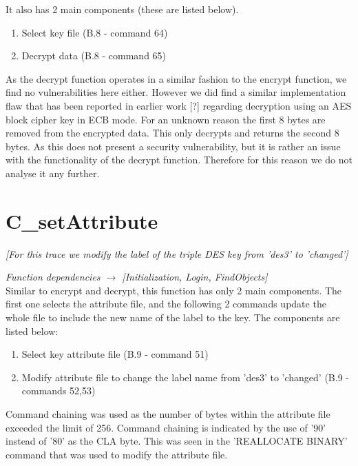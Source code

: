 \documentclass[bsc,frontabs,twoside,singlespacing,parskip,deptreport]{infthesis}     %
\begin{document}
It also has 2 main components (these are listed below).\\

\begin{enumerate}
\item Select key file (B.8 - command 64)
\item Decrypt data (B.8 - command 65)\\
\end{enumerate}

As the decrypt function operates in a similar fashion to the encrypt function, we find no vulnerabilities here either. However we did find a similar implementation flaw that has been reported in earlier work [?] regarding decryption using an AES block cipher key in ECB mode. For an unknown reason the first 8 bytes are removed from the encrypted data. This only decrypts and returns the second 8 bytes. As this does not present a security vulnerability, but it is rather an issue with the functionality of the decrypt function. Therefore for this reason we do not analyse it any further.

\section{C\_setAttribute}
\textit{[For this trace we modify the label of the triple DES key from 'des3' to 'changed']}

\textit{Function dependencies $\rightarrow$ [Initialization, Login, FindObjects]}\\

Similar to encrypt and decrypt, this function has only 2 main components. The first one selects the attribute file, and the following 2 commands update the whole file to include the new name of the label to the key. The components are listed below:\\

\begin{enumerate}
\item Select key attribute file (B.9 - command 51)
\item Modify attribute file to change the label name from 'des3' to  'changed' (B.9 - commands 52,53)\\
\end{enumerate}

Command chaining was used as the number of bytes within the attribute file exceeded the limit of 256. Command chaining is indicated by the use of '90' instead of '80' as the CLA byte. This was seen in the 'REALLOCATE BINARY' command that was used to modify the attribute file.
\end{document}
